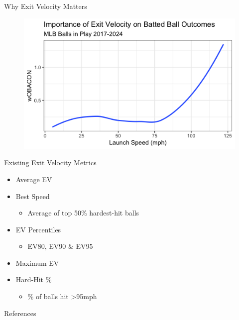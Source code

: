 \documentclass{beamer}
\begin{document}
\begin{frame}{Why Exit Velocity Matters}
    \begin{figure}
        \centering
        \includegraphics[width=\linewidth]{plots/ev_woba.png}
        \label{fig:ev_woba}
    \end{figure}
\end{frame}

\begin{frame}{Existing Exit Velocity Metrics}
\begin{itemize}
    \item Average EV
    \item Best Speed
    \begin{itemize}
        \item Average of top 50\% hardest-hit balls
    \end{itemize}
    \item EV Percentiles
    \begin{itemize}
        \item EV80, EV90 \& EV95
    \end{itemize}
    \item Maximum EV
    \item Hard-Hit \%
    \begin{itemize}
        \item \% of balls hit >95mph
    \end{itemize}
\end{itemize}
\end{frame}

\begin{frame}{References}
    \printbibliography
\end{frame}
\end{document}
